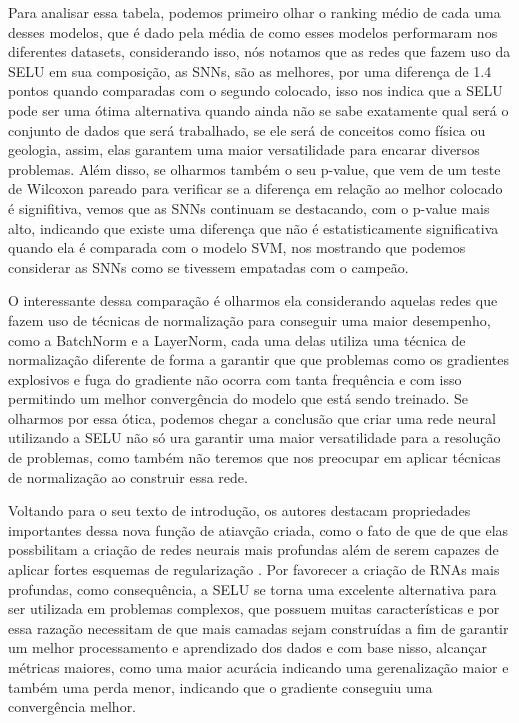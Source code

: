 Para analisar essa tabela, podemos primeiro olhar o ranking médio de cada uma desses modelos, que é dado pela média de como esses modelos performaram nos diferentes datasets, considerando isso, nós notamos que as redes que fazem uso da SELU em sua composição, as SNNs, são as melhores, por uma diferença de 1.4 pontos quando comparadas com o segundo colocado, isso nos indica que a SELU pode ser uma ótima alternativa quando ainda não se sabe exatamente qual será o conjunto de dados que será trabalhado, se ele será de conceitos como física ou geologia, assim, elas garantem uma maior versatilidade para encarar diversos problemas. Além disso, se olharmos também o seu p-value, que vem de um teste de Wilcoxon pareado para verificar se a diferença em relação ao melhor colocado é signifitiva, vemos que as SNNs continuam se destacando, com o p-value mais alto, indicando que existe uma diferença que não é estatisticamente significativa quando ela é comparada com o modelo SVM, nos mostrando que podemos considerar as SNNs como se tivessem empatadas com o campeão.

O interessante dessa comparação é olharmos ela considerando aquelas redes que fazem uso de técnicas de normalização para conseguir uma maior desempenho, como a BatchNorm e a LayerNorm, cada uma delas utiliza uma técnica de normalização diferente de forma a garantir que que problemas como os gradientes explosivos e fuga do gradiente não ocorra com tanta frequência e com isso permitindo um melhor convergência do modelo que está sendo treinado. Se olharmos por essa ótica, podemos chegar a conclusão que criar uma rede neural utilizando a SELU não só ura garantir uma maior versatilidade para a resolução de problemas, como também não teremos que nos preocupar em aplicar técnicas de normalização ao construir essa rede.

Voltando para o seu texto de introdução, os autores destacam propriedades importantes dessa nova função de atiavção criada, como o fato de que de que elas possbilitam a criação de redes neurais mais profundas além de serem capazes de aplicar fortes esquemas de regularização \parencite{SELUArticle}. Por favorecer a criação de RNAs mais profundas, como consequência, a SELU se torna uma excelente alternativa para ser utilizada em problemas complexos, que possuem muitas características e por essa razação necessitam de que mais camadas sejam construídas a fim de garantir um melhor processamento e aprendizado dos dados e com base nisso, alcançar métricas maiores, como uma maior acurácia indicando uma gerenalização maior e também uma perda menor, indicando que o gradiente conseguiu uma convergência melhor.

